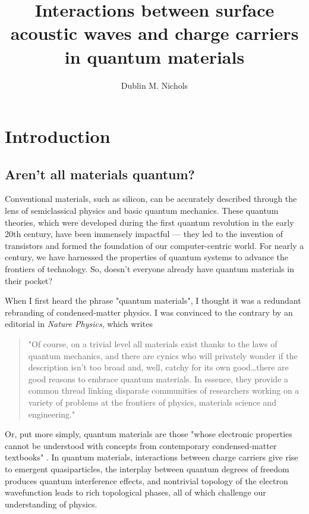 \documentclass[double,12pt,1in,seploa]{beavtex}
\title{Interactions between surface acoustic waves and charge carriers in quantum materials}
\author{Dublin M. Nichols}
\let\Oldsection\section
\renewcommand{\section}{\FloatBarrier\Oldsection}
\begin{document}
\maketitle
\mainmatter


%

\chapter{Introduction}

\section{Aren't all materials quantum?}

Conventional materials, such as silicon, can be accurately described through the lens of semiclassical physics and basic quantum mechanics. These quantum theories, which were developed during the first quantum revolution in the early 20th century, have been immensely impactful — they led to the invention of transistors and formed the foundation of our computer-centric world. For nearly a century, we have harnessed the properties of quantum systems to advance the frontiers of technology. So, doesn't everyone already have quantum materials in their pocket?

When I first heard the phrase "quantum materials", I thought it was a redundant rebranding of condensed-matter physics. I was convinced to the contrary by an editorial in \textit{Nature Physics}, which writes

\begin{quote}
"Of course, on a trivial level all materials exist thanks to the laws of quantum mechanics, and there are cynics who will privately wonder if the description isn’t too broad and, well, catchy for its own good\dots there are good reasons to embrace quantum materials. In essence, they provide a common thread linking disparate communities of researchers working on a variety of problems at the frontiers of physics, materials science and engineering." \cite{noauthor_rise_2016}
\end{quote}
Or, put more simply, quantum materials are those "whose electronic properties cannot be understood with concepts from contemporary condensed-matter textbooks" \cite{orenstein_ultrafast_2012}. In quantum materials, interactions between charge carriers give rise to emergent quasiparticles, the interplay between quantum degrees of freedom produces quantum interference effects, and nontrivial topology of the electron wavefunction leads to rich topological phases, all of which challenge our understanding of physics.
\end{document}
